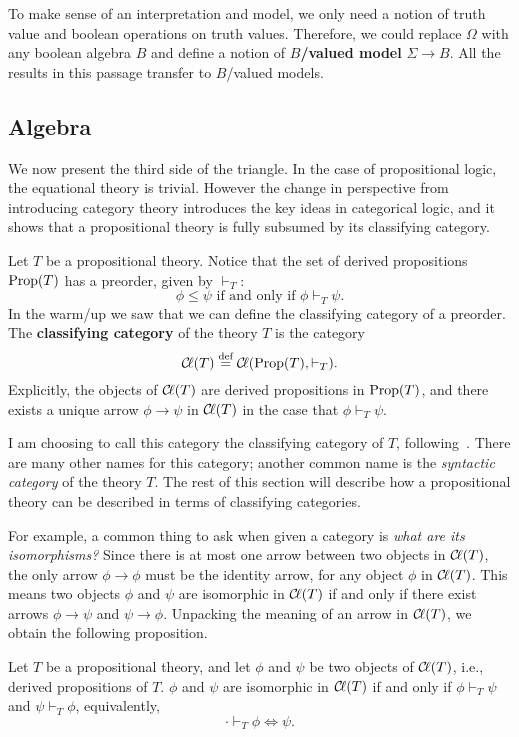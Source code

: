 \documentclass[../main.tex]{subfiles}
\begin{document}
\begin{remark}
  To make sense of an interpretation and model, we only need a notion of truth
  value and boolean operations on truth values. Therefore, we could replace
  \(\Omega\) with any boolean algebra \(B\) and define a notion of
  \textbf{\(B\)\-/valued model} \(\Sigma \to B\). All the results in this
  passage transfer to \(B\)\-/valued models.
\end{remark}

\subsection*{Algebra}

We now present the third side of the triangle. In the case of propositional
logic, the equational theory is trivial. However the change in perspective from
introducing category theory introduces the key ideas in categorical logic, and
it shows that a propositional theory is fully subsumed by its classifying
category.

\begin{definition}
  Let \(T\) be a propositional theory. Notice that the set of derived
  propositions \(\text{{\normalfont{Prop}}}{{\left({T}\right)}}\) has a preorder, given by \(\vdash_T\):
  \[%
    \phi \leq \psi \text{ if and only if } \phi \vdash_T \psi.
  \]%
  In the warm\-/up we saw that we can define the classifying category of a
  preorder. The \textbf{classifying category} of the theory \(T\) is the
  category
  \[%
    \Cl\pwrap{T} \eqdef \Cl\pwrap{\Prop{T},\vdash_T}.
  \]%
  Explicitly, the objects of \({\mathcal{C}\kern-.15em\ell}{\left(T\right)}\) are derived propositions in
  \(\text{{\normalfont{Prop}}}{{\left({T}\right)}}\), and there exists a unique arrow \(\phi \to \psi\) in
  \({\mathcal{C}\kern-.15em\ell}{\left(T\right)}\) in the case that \(\phi \vdash_T \psi\).
\end{definition}
I am choosing to call this category the classifying category of \(T\),
following~\cite{Jacobs1999}. There are many other names for this category;
another common name is the \emph{syntactic category} of the theory \(T\). The
rest of this section will describe how a propositional theory can be described
in terms of classifying categories.

For example, a common thing to ask when given a category is \emph{what are its
  isomorphisms?} Since there is at most one arrow between two objects in
\({\mathcal{C}\kern-.15em\ell}{\left(T\right)}\), the only arrow \(\phi \to \phi\) must be the identity arrow,
for any object \(\phi\) in \({\mathcal{C}\kern-.15em\ell}{\left(T\right)}\). This means two objects \(\phi\) and
\(\psi\) are isomorphic in \({\mathcal{C}\kern-.15em\ell}{\left(T\right)}\) if and only if there exist arrows
\(\phi \to \psi\) and \(\psi \to \phi\). Unpacking the meaning of an arrow in
\({\mathcal{C}\kern-.15em\ell}{\left(T\right)}\), we obtain the following proposition.
\begin{proposition}
  Let \(T\) be a propositional theory, and let \(\phi\) and \(\psi\) be two
  objects of \({\mathcal{C}\kern-.15em\ell}{\left(T\right)}\), i.e., derived propositions of \(T\). \(\phi\) and
  \(\psi\) are isomorphic in \({\mathcal{C}\kern-.15em\ell}{\left(T\right)}\) if and only if \(\phi \vdash_T
  \psi\) and \(\psi \vdash_T \phi\), equivalently,
  \[%
    \cdot \vdash_T \phi \Leftrightarrow \psi.
  \]%
\end{proposition}
\end{document}
